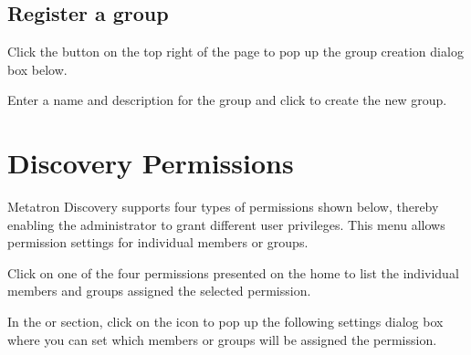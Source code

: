 \documentclass[letterpaper,10pt,english]{sphinxmanual}
\begin{document}
\subsection{Register a group}
\label{\detokenize{discovery/part08/groups:id4}}
Click the  button on the top right of the page to pop up the group creation dialog box below.
\begin{quote}

\begin{figure}[H]
\centering

\noindent{}
\end{figure}
\end{quote}

Enter a name and description for the group and click   to create the new group.


\section{Discovery Permissions}
\label{\detokenize{discovery/part08/permissions:id1}}\label{\detokenize{discovery/part08/permissions::doc}}
Metatron Discovery supports four types of permissions shown below, thereby enabling the administrator to grant different user privileges. This menu allows permission settings for individual members or groups.
\begin{quote}

\begin{figure}[H]
\centering

\noindent{}
\end{figure}
\end{quote}

Click on one of the four permissions presented on the home to list the individual members and groups assigned the selected permission.
\begin{quote}

\begin{figure}[H]
\centering

\noindent{}
\end{figure}
\end{quote}

In the  or  section, click on the  icon to pop up the following settings dialog box where you can set which members or groups will be assigned the permission.
\begin{quote}

\begin{figure}[H]
\centering

\noindent{}
\end{figure}
\end{quote}
\end{document}
